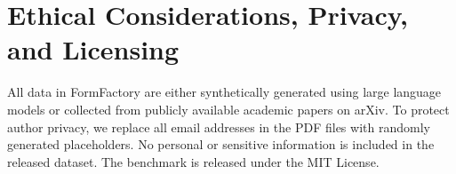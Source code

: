 \documentclass[sigconf, screen, review]{acmart}
\newcommand{\bobo}[1]{%
  \begin{CJK}{UTF8}{gbsn} %
  {\color{cyan}Bobo: #1}%
  \end{CJK}%
}
\begin{document}


\section{Ethical Considerations, Privacy, and Licensing}

All data in FormFactory are either synthetically generated using large language models or collected from publicly available academic papers on arXiv.
To protect author privacy, we replace all email addresses in the PDF files with randomly generated placeholders.
No personal or sensitive information is included in the released dataset.
The benchmark is released under the MIT License.





\end{document}
